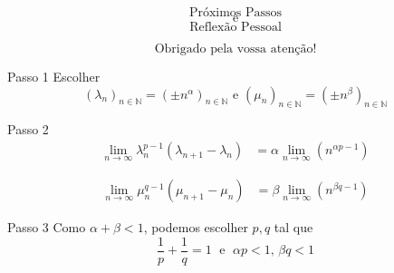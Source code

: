 \documentclass{beamer}
\begin{document}
\begin{frame}{}
    \Large $$\text{ Próximos Passos }$$
    \Large $$\text{ e }$$
    \Large $$\text{ Reflexão Pessoal }$$
\end{frame}

\begin{frame}{}
\Large $$\text{Obrigado pela vossa atenção!}$$
\end{frame}

\begin{frame}{}
\begin{block}{Passo 1}
Escolher $$(\lambda_n)_{n \in \mathbb{N}}=(\pm n^\alpha)_{n \in \mathbb{N}} \text{ e } (\mu_n)_{n \in \mathbb{N}}=(\pm n^\beta)_{n \in \mathbb{N}}$$
\end{block}
\pause
\begin{block}{Passo 2}
    \begin{align*}
        \lim_{n \rightarrow \infty}\lambda_n^{p-1}(\lambda_{n+1}-\lambda_n)&=\alpha \lim_{n \rightarrow \infty}(n^{\alpha p-1})
    \end{align*}

        \begin{align*}
        \lim_{n \rightarrow \infty}\mu_n^{q-1}(\mu_{n+1}-\mu_n)&=\beta \lim_{n \rightarrow \infty}(n^{\beta q-1})
    \end{align*}

\end{block}    
\pause
\begin{block}{Passo 3}
    Como $\alpha + \beta <1$, podemos escolher $p,q$ tal que $$\frac{1}{p}+\frac{1}{q}=1 \;\text{ e }\; \alpha p<1, \,\beta q<1$$ 
\end{block}
\end{frame}
\end{document}
